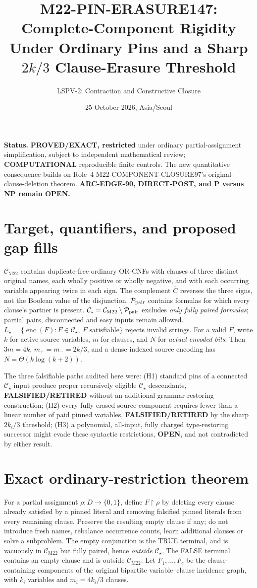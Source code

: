 \documentclass[11pt]{article}
\title{M22-PIN-ERASURE147:\\Complete-Component Rigidity Under Ordinary Pins and a Sharp $2k/3$ Clause-Erasure Threshold}
\author{LSPV-2: Contraction and Constructive Closure}
\date{25 October 2026, Asia/Seoul}
\newcommand{\CM}{\mathcal C_{\mathrm{M22}}}
\newcommand{\Cs}{\mathcal C_\star}
\begin{document}
\maketitle
\noindent\textbf{Status.} \textbf{PROVED/EXACT, restricted} under ordinary partial-assignment simplification, subject to independent mathematical review; \textbf{COMPUTATIONAL} reproducible finite controls. The new quantitative consequence builds on Role~4 M22-COMPONENT-CLOSURE97's original-clause-deletion theorem. \textbf{ARC-EDGE-90, DIRECT-POST, and P versus NP remain OPEN.}

\section{Target, quantifiers, and proposed gap fills}
\(\CM\) contains duplicate-free ordinary OR-CNFs with clauses of three distinct original names, each wholly positive or wholly negative, and with each occurring variable appearing twice in each sign. The complement \(\bar C\) reverses the three signs, not the Boolean value of the disjunction. \(\mathcal P_{\rm pair}\) contains formulas for which every clause's partner is present. \(\Cs=\CM\setminus\mathcal P_{\rm pair}\) excludes \emph{only fully paired formulas}; partial pairs, disconnected and easy inputs remain allowed. \(L_\star=\{\operatorname{enc}(F):F\in\Cs,\ F\text{ satisfiable}\}\) rejects invalid strings. For a valid \(F\), write \(k\) for active source variables, \(m\) for clauses, and \(N\) for \emph{actual encoded bits}. Then \(3m=4k\), \(m_+=m_-=2k/3\), and a dense indexed source encoding has \(N=\Theta(k\log(k+2))\).

\noindent The three falsifiable paths audited here were: (H1) standard pins of a connected \(\Cs\) input produce proper recursively eligible \(\Cs\) descendants, \textbf{FALSIFIED/RETIRED} without an additional grammar-restoring construction; (H2) every fully erased source component requires fewer than a linear number of paid pinned variables, \textbf{FALSIFIED/RETIRED} by the sharp \(2k_i/3\) threshold; (H3) a polynomial, all-input, fully charged type-restoring successor might evade these syntactic restrictions, \textbf{OPEN}, and not contradicted by either result.

\section{Exact ordinary-restriction theorem}
For a partial assignment \(\rho:D\to\{0,1\}\), define \(F\!\restriction\rho\) by deleting every clause already satisfied by a pinned literal and removing falsified pinned literals from every remaining clause. Preserve the resulting empty clause if any; do not introduce fresh names, rebalance occurrence counts, learn additional clauses or solve a subproblem. The empty conjunction is the TRUE terminal, and is vacuously in \(\CM\) but fully paired, hence \emph{outside} \(\Cs\). The FALSE terminal contains an empty clause and is outside \(\CM\). Let \(F_1,\dots,F_c\) be the clause-containing components of the original bipartite variable--clause incidence graph, with \(k_i\) variables and \(m_i=4k_i/3\) clauses.
\end{document}
